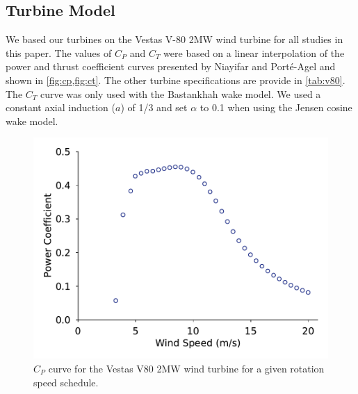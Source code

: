 \documentclass[hidelinks,sort&compress,AMA,STIX1COL]{WileyNJD-v2}
\providecommand{\DIFaddbeginFL}{} %
\providecommand{\DIFaddendFL}{} %
\providecommand{\DIFdelbeginFL}{} %
\providecommand{\DIFdelendFL}{} %
\newcommand{\DIFscaledelfig}{0.5}
\newlength{\DIFdelgraphicswidth} %
\newlength{\DIFdelgraphicsheight} %
\newcommand{\DIFaddincludegraphics}[2][]{{\color{blue}\fbox{\DIFOincludegraphics[#1]{#2}}}} %
\newcommand{\DIFdelincludegraphics}[2][]{%
\sbox{\DIFdelgraphicsbox}{\DIFOincludegraphics[#1]{#2}}%
\settoboxwidth{\DIFdelgraphicswidth}{\DIFdelgraphicsbox} %
\settoboxtotalheight{\DIFdelgraphicsheight}{\DIFdelgraphicsbox} %
\scalebox{\DIFscaledelfig}{%
\parbox[b]{\DIFdelgraphicswidth}{\usebox{\DIFdelgraphicsbox}\\[-\baselineskip] \rule{\DIFdelgraphicswidth}{0em}}\llap{\resizebox{\DIFdelgraphicswidth}{\DIFdelgraphicsheight}{%
\setlength{\unitlength}{\DIFdelgraphicswidth}%
\begin{picture}(1,1)%
\thicklines\linethickness{2pt} %
{\color[rgb]{1,0,0}\put(0,0){\framebox(1,1){}}}%
{\color[rgb]{1,0,0}\put(0,0){\line( 1,1){1}}}%
{\color[rgb]{1,0,0}\put(0,1){\line(1,-1){1}}}%
\end{picture}%
}\hspace*{3pt}}} %
} %
\DeclareRobustCommand{\DIFaddbeginFL}{\DIFOaddbeginFL \let\includegraphics\DIFaddincludegraphics} %
\DeclareRobustCommand{\DIFaddendFL}{\DIFOaddendFL \let\includegraphics\DIFOincludegraphics} %
\DeclareRobustCommand{\DIFdelbeginFL}{\DIFOdelbeginFL \let\includegraphics\DIFdelincludegraphics} %
\DeclareRobustCommand{\DIFdelendFL}{\DIFOaddendFL \let\includegraphics\DIFOincludegraphics} %
\begin{document}
\subsection{Turbine Model}
We based our turbines on the Vestas V-80 2MW wind turbine for all studies in this paper. The values of $C_P$ and $C_T$ were based on a linear interpolation of the power and thrust coefficient curves presented by Niayifar and Port\'e-Agel\cite{niayifar2016} and shown in \cref{fig:cp,fig:ct}. The other turbine specifications are provide in \cref{tab:v80}. The $C_T$ curve was only used with the Bastankhah wake model. We used a constant axial induction ($a$) of 1/3 and set $\alpha$ to 0.1 when using the Jensen cosine wake model.
%
\begin{figure}[h!]
	\centering
	\begin{minipage}[t]{0.48\textwidth}
		\centering
		\DIFdelbeginFL %
\DIFdelendFL \DIFaddbeginFL \includegraphics[width=\textwidth, trim={0cm 0cm 0cm 0cm}, clip]{inputs/Figure_4}
		\DIFaddendFL \caption{$C_P$ curve for the Vestas V80 2MW wind turbine \cite{niayifar2016} for a given rotation speed schedule.}
		\label{fig:cp}
	\end{minipage}\hspace{1pc}%
	\begin{minipage}[t]{0.48\textwidth}
		\centering
		\DIFdelbeginFL %

\end{minipage}
\end{figure}
\end{document}

